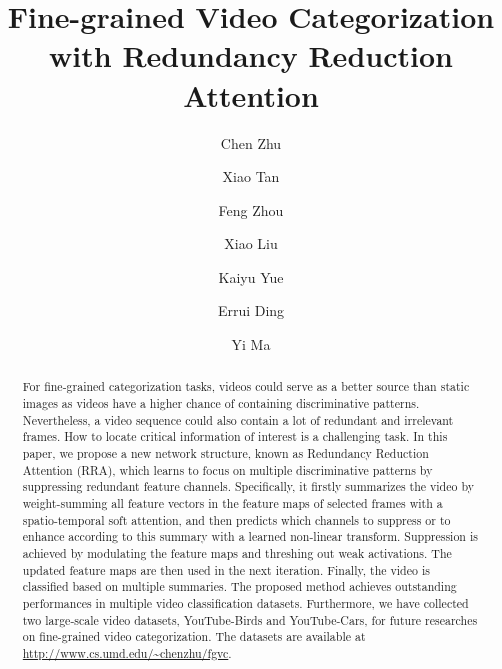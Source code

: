 \documentclass[runningheads]{llncs}
\begin{document}
\title{Fine-grained Video Categorization with Redundancy Reduction Attention} 


\author{Chen Zhu \and
Xiao Tan \and Feng Zhou \and Xiao Liu \and Kaiyu Yue \and Errui Ding \and
Yi Ma}



\maketitle              \begin{abstract}
For fine-grained categorization tasks, videos could serve as a better source than static images as videos have a higher chance of containing discriminative patterns. 
Nevertheless, a video sequence could also contain a lot of redundant and irrelevant frames. 
How to locate critical information of interest is a challenging task. 
In this paper, we propose a new network structure, known as Redundancy Reduction Attention (RRA), which learns to focus on multiple discriminative patterns by suppressing redundant feature channels. 
Specifically, it firstly summarizes the video by weight-summing all feature vectors in the feature maps of selected frames with a spatio-temporal soft attention, and then predicts which channels to suppress or to enhance according to this summary with a learned non-linear transform. 
Suppression is achieved by modulating the feature maps and threshing out weak activations. The updated feature maps are then used in the next iteration. 
Finally, the video is classified based on multiple summaries. The proposed method achieves outstanding performances in multiple video classification datasets. 
Furthermore, we have collected two large-scale video datasets, YouTube-Birds and YouTube-Cars, for future researches on fine-grained video categorization. 
The datasets are available at \href{http://www.cs.umd.edu/~chenzhu/fgvc}{\url{http://www.cs.umd.edu/~chenzhu/fgvc}}.
\end{abstract}
\end{document}
